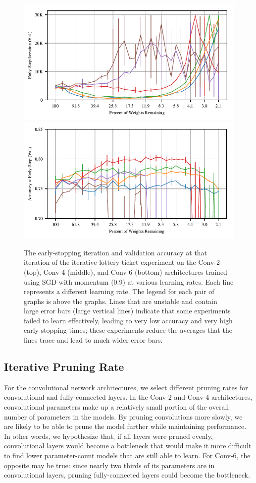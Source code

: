 \begin{figure}
\includegraphics[width=.5\textwidth]{graphs/cifar10/conv/momentum_rate_sweep3/iteration}%
\includegraphics[width=.5\textwidth]{graphs/cifar10/conv/momentum_rate_sweep3/accuracy}
\caption{The early-stopping iteration and validation accuracy at that iteration  of the iterative lottery ticket experiment on the Conv-2 (top), Conv-4 (middle),
and Conv-6 (bottom) architectures trained using
SGD with momentum (0.9) at various learning rates. Each line represents a different learning rate. The legend for each pair of graphs is above the graphs.
Lines that are unstable and contain large error bars (large vertical lines) indicate that some experiments failed to
learn effectively, leading to very low accuracy and very high early-stopping times; these experiments reduce the averages that the lines trace and lead to
much wider error bars.}
\label{fig:appendix-conv-momentum}
\end{figure}

\subsection{Iterative Pruning Rate}
\label{app:conv-rate}

For the convolutional network architectures, we select different pruning rates for convolutional and fully-connected layers. In the Conv-2 and Conv-4 architectures,
convolutional parameters make up a relatively small portion of the overall number of parameters in the models. By pruning convolutions more slowly, we are likely
to be able to prune the model further while maintaining performance. In other words, we hypothesize that, if all layers were pruned evenly, convolutional layers
would become a bottleneck that would make it more difficult to find lower parameter-count models that are still able to learn. For Conv-6, the opposite
may be true: since nearly two thirds of its parameters are in convolutional layers, pruning fully-connected layers could become the bottleneck.

